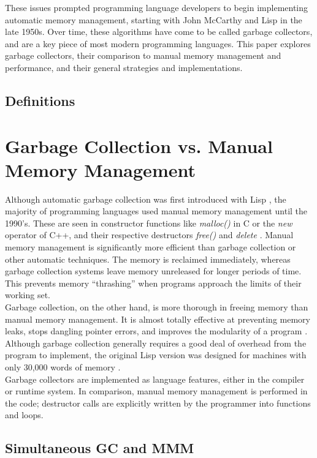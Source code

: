 \documentclass[12pt]{article}
\begin{document}
These issues prompted programming language developers to begin implementing automatic memory management, starting with John McCarthy and Lisp in the late 1950s.\cite{https://www.seas.harvard.edu/courses/cs252/2016fa/16.pdf} Over time, these algorithms have come to be called garbage collectors, and are a key piece of most modern programming languages. This paper explores garbage collectors, their comparison to manual memory management and performance, and their general strategies and implementations. 

\subsection{Definitions}
\section{Garbage Collection vs. Manual Memory Management}
Although automatic garbage collection was first introduced with Lisp \cite{chis11}, the majority of programming languages used manual memory management until the 1990's. These are seen in constructor functions like \textit{malloc()} in C or the \textit{new} operator of C++, and their respective destructors \textit{free()} and \textit{delete} \cite{pythDocs}. Manual memory management is significantly more efficient than garbage collection or other automatic techniques. The memory is reclaimed immediately, whereas garbage collection systems leave memory unreleased for longer periods of time. This prevents memory ``thrashing'' when programs approach the limits of their working set.\\

Garbage collection, on the other hand, is more thorough in freeing memory than manual memory management. It is almost totally effective at preventing memory leaks, stops dangling pointer errors, and improves the modularity of a program \cite{hertz05}. Although garbage collection generally requires a good deal of overhead from the program to implement, the original Lisp version was designed for machines with only 30,000 words of memory \cite{chis11}.\\

Garbage collectors are implemented as language features, either in the compiler or runtime system. In comparison, manual memory management is performed in the code; destructor calls are explicitly written by the programmer into functions and loops.
\subsection{Simultaneous GC and MMM}
\end{document}
